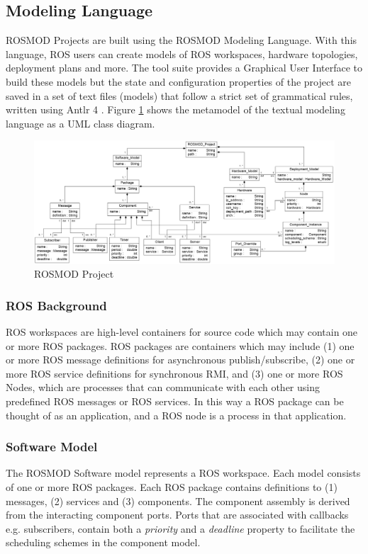 
\subsection{Modeling Language}

ROSMOD Projects are built using the ROSMOD Modeling Language. With this language, ROS users can create models of ROS workspaces, hardware topologies, deployment plans and more. The tool suite provides a Graphical User Interface to build these models but the state and configuration properties of the project are saved in a set of text files (models) that follow a strict set of grammatical rules, written using Antlr 4 \cite{ANTLR_BOOK}. Figure \ref{fig:ROSMOD_Project} shows the metamodel of the textual modeling language as a UML \cite{UML} class diagram.

\begin{figure}[t]
	\centering	
	\includegraphics[width=1.0\linewidth]{figs/ROSMOD_Project.png}
	\caption{ROSMOD Project}
	\label{fig:ROSMOD_Project}	
\end{figure}

\subsubsection{ROS Background}
ROS workspaces are high-level containers for source code which may contain one or more ROS packages.  ROS packages are containers which may include (1) one or more ROS message definitions for asynchronous publish/subscribe, (2) one or more ROS service definitions for synchronous RMI, and (3) one or more ROS Nodes, which are processes that can communicate with each other using predefined ROS messages or ROS services.  In this way a ROS package can be thought of as an application, and a ROS node is a process in that application.

\subsubsection{Software Model}
The ROSMOD Software model represents a ROS workspace. Each model consists of one or more ROS packages. Each ROS package contains definitions to (1) messages, (2) services and (3) components. The component assembly is derived from the interacting component ports. Ports that are associated with callbacks e.g. subscribers, contain both a \emph{priority} and a \emph{deadline} property to facilitate the scheduling schemes in the component model.

